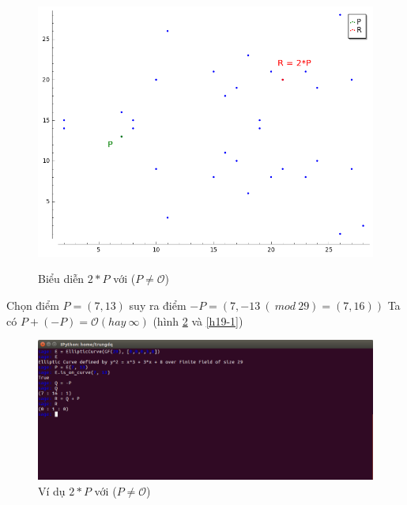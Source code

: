 \documentclass[a4paper,12pt]{report}
\begin{document}
\begin{center}
\begin{figure}[H]
\includegraphics[width=0.8\linewidth]{../im14.png} \label{h14}
\caption{Biểu diễn $2*P$ với ($P \neq \mathcal{O}$)}
\end{figure}
\end{center}

Chọn điểm $P = (7, 13)$ suy ra điểm $-P = (7, -13 \ (\ mod \ 29 )= (7, 16))$ Ta có $P + (-P) = \mathcal{O}(hay \ \infty)$ (hình \ref{h19} và \ref{h19-1})

\begin{center}
\begin{figure}[H]
\includegraphics[width=0.9\linewidth]{../im19.png}
\caption{Ví dụ $2*P$ với ($P \neq \mathcal{O}$)} \label{h19}
\end{figure}
\end{center}
\end{document}
